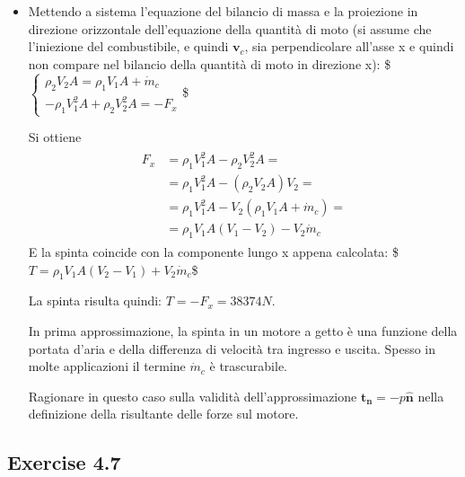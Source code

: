 \documentclass[letterpaper,10pt,italian]{jupyterBook}
\begin{document}
\begin{itemize}
\item {} 
\sphinxAtStartPar
Mettendo a sistema l’equazione del bilancio di massa e la proiezione
in direzione orizzontale dell’equazione della quantità di moto (si
assume che l’iniezione del combustibile, e quindi \(\bm{v}_c\), sia
perpendicolare all’asse x e quindi non compare nel bilancio della
quantità di moto in direzione x): \$\(\begin{cases}
    \rho_2 V_2 A = \rho_1 V_1 A + \dot{m}_c \\
    -\rho_1 V_1^2 A + \rho_2 V_2^2 A = -F_x 
  \end{cases}\)\$

\sphinxAtStartPar
Si ottiene
\begin{equation*}
\begin{split}\begin{aligned}
        F_x & = \rho_1 V_1^2 A - \rho_2 V_2^2 A = \\
            & = \rho_1 V_1^2 A - (\rho_2 V_2 A) V_2 = \\
            & = \rho_1 V_1^2 A - V_2 (\rho_1 V_1 A + \dot{m}_c) = \\
            & = \rho_1 V_1 A (V_1 - V_2) - V_2 \dot{m}_c
      \end{aligned}\end{split}
\end{equation*}
\sphinxAtStartPar
E la spinta coincide con la componente lungo x appena calcolata:
\$\(T = \rho_1 V_1 A (V_2 - V_1) + V_2 \dot{m}_c\)\$

\sphinxAtStartPar
La spinta risulta quindi: \(T = -F_x = 38374N\).

\sphinxAtStartPar
{}

\sphinxAtStartPar
In prima approssimazione, la spinta in un motore a getto è una
funzione della portata d’aria e della differenza di velocità tra
ingresso e uscita. Spesso in molte applicazioni il termine
\(\dot{m}_c\) è trascurabile.

\sphinxAtStartPar
Ragionare in questo caso sulla validità dell’approssimazione
\(\bm{t_n} = -p\bm{\hat{n}}\) nella definizione della risultante delle
forze sul motore.

\end{itemize}

\sphinxstepscope


\subsection{Exercise 4.7}
\label{\detokenize{polimi/fluidmechanics-ita/template/capitoli/04_bilanci/0404in:exercise-4-7}}\label{\detokenize{polimi/fluidmechanics-ita/template/capitoli/04_bilanci/0404in:fluid-mechanics-balances-ex-07}}\label{\detokenize{polimi/fluidmechanics-ita/template/capitoli/04_bilanci/0404in::doc}}
\end{document}

